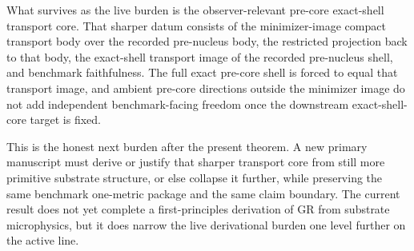\documentclass[11pt]{article}
\begin{document}
What survives as the live burden is the observer-relevant pre-core exact-shell transport core. That sharper datum consists of the minimizer-image compact transport body over the recorded pre-nucleus body, the restricted projection back to that body, the exact-shell transport image of the recorded pre-nucleus shell, and benchmark faithfulness. The full exact pre-core shell is forced to equal that transport image, and ambient pre-core directions outside the minimizer image do not add independent benchmark-facing freedom once the downstream exact-shell-core target is fixed.

This is the honest next burden after the present theorem. A new primary manuscript must derive or justify that sharper transport core from still more primitive substrate structure, or else collapse it further, while preserving the same benchmark one-metric package and the same claim boundary. The current result does not yet complete a first-principles derivation of GR from substrate microphysics, but it does narrow the live derivational burden one level further on the active line.
\end{document}

